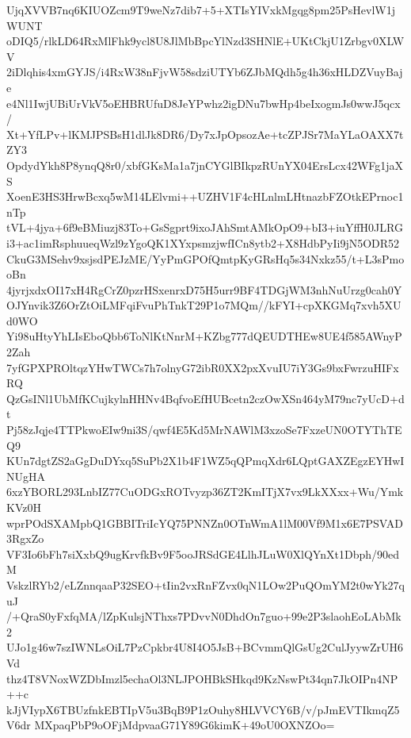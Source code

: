 UjqXVVB7nq6KIUOZcm9T9weNz7dib7+5+XTIsYIVxkMgqg8pm25PsHevlW1jWUNT
oDIQ5/rlkLD64RxMlFhk9ycl8U8JlMbBpcYlNzd3SHNlE+UKtCkjU1Zrbgv0XLWV
2iDlqhis4xmGYJS/i4RxW38nFjvW58sdziUTYb6ZJbMQdh5g4h36xHLDZVuyBaje
e4Nl1IwjUBiUrVkV5oEHBRUfuD8JeYPwhz2igDNu7bwHp4beIxogmJs0wwJ5qcx/
Xt+YfLPv+lKMJPSBsH1dlJk8DR6/Dy7xJpOpsozAe+tcZPJSr7MaYLaOAXX7tZY3
OpdydYkh8P8ynqQ8r0/xbfGKsMa1a7jnCYGlBIkpzRUnYX04ErsLcx42WFg1jaXS
XoenE3HS3HrwBcxq5wM14LElvmi++UZHV1F4cHLnlmLHtnazbFZOtkEPrnoc1nTp
tVL+4jya+6f9eBMiuzj83To+GsSgprt9ixoJAhSmtAMkOpO9+bI3+iuYffH0JLRG
i3+ac1imRsphuueqWzl9zYgoQK1XYxpsmzjwfICn8ytb2+X8HdbPyIi9jN5ODR52
CkuG3MSehv9xsjsdPEJzME/YyPmGPOfQmtpKyGRsHq5s34Nxkz55/t+L3sPmooBn
4jyrjxdxOI17xH4RgCrZ0pzrHSxenrxD75H5urr9BF4TDGjWM3nhNuUrzg0cah0Y
OJYnvik3Z6OrZtOiLMFqiFvuPhTnkT29P1o7MQm//kFYI+cpXKGMq7xvh5XUd0WO
Yi98uHtyYhLIsEboQbb6ToNlKtNnrM+KZbg777dQEUDTHEw8UE4f585AWnyP2Zah
7yfGPXPROltqzYHwTWCs7h7olnyG72ibR0XX2pxXvuIU7iY3Gs9bxFwrzuHIFxRQ
QzGsINl1UbMfKCujkylnHHNv4BqfvoEfHUBcetn2czOwXSn464yM79nc7yUcD+dt
Pj58zJqje4TTPkwoEIw9ni3S/qwf4E5Kd5MrNAWlM3xzoSe7FxzeUN0OTYThTEQ9
KUn7dgtZS2aGgDuDYxq5SuPb2X1b4F1WZ5qQPmqXdr6LQptGAXZEgzEYHwINUgHA
6xzYBORL293LnbIZ77CuODGxROTvyzp36ZT2KmITjX7vx9LkXXxx+Wu/YmkKVz0H
wprPOdSXAMpbQ1GBBITriIcYQ75PNNZn0OTnWmA1lM00Vf9M1x6E7PSVAD3RgxZo
VF3Io6bFh7siXxbQ9ugKrvfkBv9F5ooJRSdGE4LlhJLuW0XlQYnXt1Dbph/90edM
VskzlRYb2/eLZnnqaaP32SEO+tIin2vxRnFZvx0qN1LOw2PuQOmYM2t0wYk27quJ
/+QraS0yFxfqMA/lZpKulsjNThxs7PDvvN0DhdOn7guo+99e2P3slaohEoLAbMk2
UJo1g46w7szIWNLsOiL7PzCpkbr4U8I4O5JsB+BCvmmQlGsUg2CulJyywZrUH6Vd
thz4T8VNoxWZDbImzl5echaOl3NLJPOHBkSHkqd9KzNswPt34qn7JkOIPn4NP++c
kJjVIypX6TBUzfnkEBTIpV5u3BqB9P1zOuhy8HLVVCY6B/v/pJmEVTIkmqZ5V6dr
MXpaqPbP9oOFjMdpvaaG71Y89G6kimK+49oU0OXNZOo=
